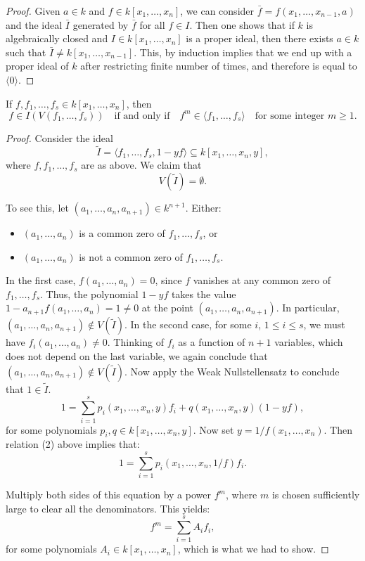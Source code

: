 \documentclass[12pt]{article}
\begin{document}
\begin{proof}
	Given $a\in k$ and $f\in k[x_1, \ldots, x_n]$, we can consider $\bar{f} = f(x_1, \ldots, x_{n-1},a )$ and the ideal $\bar I$ generated by $\bar f$ for all $f\in I$. Then one shows that if $k$ is algebraically closed and $I \in k[x_1, \ldots, x_n]$ is a proper ideal, then there
	exists $a\in k$ such that $\bar I \neq k[x_1, \ldots, x_{n-1}]$.
	This, by induction implies that we end up with a proper ideal of $k$ after restricting finite number of times, and therefore is equal to $\langle 0 \rangle$.
\end{proof}

\begin{theorem}
	If $f, f_1, \ldots, f_s \in k[x_1, \ldots, x_n]$, then
	\[
		f \in I(V(f_1, \ldots, f_s)) \quad \text{if and only if} \quad f^m \in \langle f_1, \ldots, f_s \rangle \quad \text{for some integer } m \geq 1.
	\]
\end{theorem}

\begin{proof}
	Consider the ideal
	\[
		\tilde{I} = \langle f_1, \ldots, f_s, 1 - yf \rangle \subseteq k[x_1, \ldots, x_n, y],
	\]
	where $f, f_1, \ldots, f_s$ are as above. We claim that
	\[
		V(\tilde{I}) = \emptyset.
	\]

	To see this, let $(a_1, \ldots, a_n, a_{n+1}) \in k^{n+1}$. Either:
	\begin{itemize}
		\item $(a_1, \ldots, a_n)$ is a common zero of $f_1, \ldots, f_s$, or
		\item $(a_1, \ldots, a_n)$ is not a common zero of $f_1, \ldots, f_s$.
	\end{itemize}

	In the first case, $f(a_1, \ldots, a_n) = 0$, since $f$ vanishes at any common zero of $f_1, \ldots, f_s$. Thus, the polynomial $1 - yf$ takes the value $1 - a_{n+1}f(a_1, \ldots, a_n) = 1 \neq 0$ at the point $(a_1, \ldots, a_n, a_{n+1})$. In particular, $(a_1, \ldots, a_n, a_{n+1}) \notin V(\tilde{I})$. In the second case, for some $i$, $1 \leq i \leq s$, we must have $f_i(a_1, \ldots, a_n) \neq 0$. Thinking of $f_i$ as a function of $n+1$ variables, which does not depend on the last variable, we again conclude that $(a_1, \ldots, a_n, a_{n+1}) \notin V(\tilde{I})$. Now apply the Weak Nullstellensatz to conclude that $1 \in \tilde{I}$.
	\[
		1 = \sum_{i=1}^s p_i(x_1, \ldots, x_n, y)f_i + q(x_1, \ldots, x_n, y)(1 - yf),
	\]
	for some polynomials $p_i, q \in k[x_1, \ldots, x_n, y]$. Now set $y = 1/f(x_1, \ldots, x_n)$. Then relation (2) above implies that:
	\[
		1 = \sum_{i=1}^s p_i(x_1, \ldots, x_n, 1/f)f_i.
	\]

	Multiply both sides of this equation by a power $f^m$, where $m$ is chosen sufficiently large to clear all the denominators. This yields:
	\[
		f^m = \sum_{i=1}^s A_i f_i,
	\]
	for some polynomials $A_i \in k[x_1, \ldots, x_n]$, which is what we had to show.
\end{proof}
\end{document}
